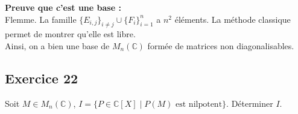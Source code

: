 \documentclass[a4paper,12pt]{article}
\begin{document}
\begin{correctionbox}
        \vspace{0.5em}
        
        \textbf{Preuve que c'est une base :}\\
        Flemme. La famille \( \{E_{i,j}\}_{i \neq j} \cup \{F_i\}_{i=1}^n \) a \( n^2 \) éléments. La méthode classique permet de montrer qu'elle est libre.\\
        Ainsi, on a bien une base de \( M_n(\mathbb{C}) \) formée de matrices non diagonalisables.
    \end{correctionbox}



    \subsection*{Exercice 22}
    Soit \( M \in M_n(\mathbb{C}) \), \( I = \{P \in \mathbb{C}[X] \mid P(M) \text{ est nilpotent}\} \). Déterminer \( I \).
    
\end{document}
